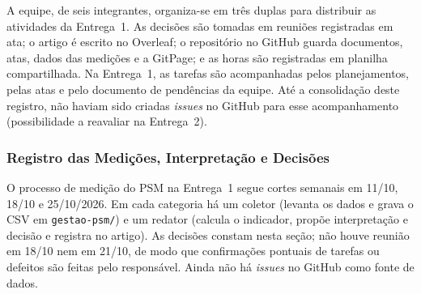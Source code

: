 
A equipe, de seis integrantes, organiza-se em três duplas para distribuir as atividades da Entrega~1. As decisões são tomadas em reuniões registradas em ata; o artigo é escrito no Overleaf; o repositório no GitHub guarda documentos, atas, dados das medições e a GitPage; e as horas são registradas em planilha compartilhada. Na Entrega~1, as tarefas são acompanhadas pelos planejamentos, pelas atas e pelo documento de pendências da equipe. Até a consolidação deste registro, não haviam sido criadas \textit{issues} no GitHub para esse acompanhamento (possibilidade a reavaliar na Entrega~2).


\subsubsection{Registro das Medições, Interpretação e Decisões}
\label{sec:psm_registro}
O processo de medição do PSM na Entrega~1 segue cortes semanais em 11/10, 18/10 e 25/10/2026. Em cada categoria há um coletor (levanta os dados e grava o CSV em \texttt{gestao-psm/}) e um redator (calcula o indicador, propõe interpretação e decisão e registra no artigo). As decisões constam nesta seção; não houve reunião em 18/10 nem em 21/10, de modo que confirmações pontuais de tarefas ou defeitos são feitas pelo responsável. Ainda não há \textit{issues} no GitHub como fonte de dados.

